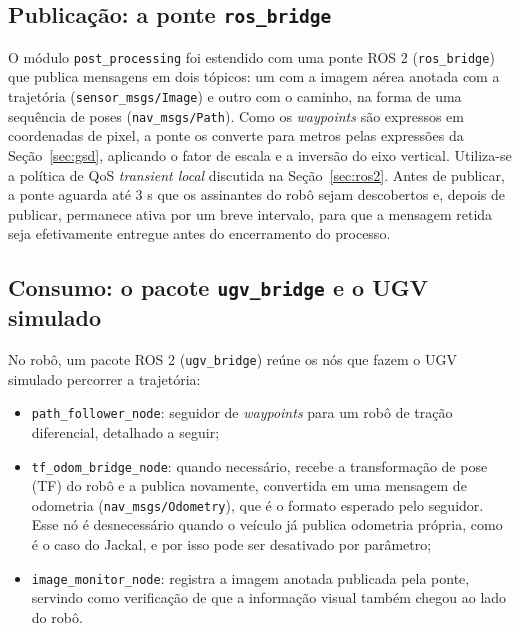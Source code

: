\documentclass[
    12pt,
    openright,
    oneside,
    a4paper,
    english,
    brazil
]{abntex2}
\begin{document}
\subsection{Publicação: a ponte \texttt{ros\_\allowbreak{}bridge}}

O módulo \texttt{post\_\allowbreak{}processing} foi estendido com uma ponte ROS 2 (\texttt{ros\_\allowbreak{}bridge}) que publica mensagens em dois tópicos: um com a imagem aérea anotada com a trajetória (\texttt{sensor\_\allowbreak{}msgs/\allowbreak{}Image}) e outro com o caminho, na forma de uma sequência de poses (\texttt{nav\_\allowbreak{}msgs/\allowbreak{}Path}). Como os \textit{waypoints} são expressos em coordenadas de pixel, a ponte os converte para metros pelas expressões da Seção~\ref{sec:gsd}, aplicando o fator de escala e a inversão do eixo vertical. Utiliza-se a política de QoS \textit{transient local} discutida na Seção~\ref{sec:ros2}. Antes de publicar, a ponte aguarda até 3 s que os assinantes do robô sejam descobertos e, depois de publicar, permanece ativa por um breve intervalo, para que a mensagem retida seja efetivamente entregue antes do encerramento do processo.

\subsection{Consumo: o pacote \texttt{ugv\_\allowbreak{}bridge} e o UGV simulado}

No robô, um pacote ROS 2 (\texttt{ugv\_\allowbreak{}bridge}) reúne os nós que fazem o UGV simulado percorrer a trajetória:

\begin{itemize}
    \item \texttt{path\_\allowbreak{}follower\_\allowbreak{}node}: seguidor de \textit{waypoints} para um robô de tração diferencial, detalhado a seguir;
    \item \texttt{tf\_\allowbreak{}odom\_\allowbreak{}bridge\_\allowbreak{}node}: quando necessário, recebe a transformação de pose (TF) do robô e a publica novamente, convertida em uma mensagem de odometria (\texttt{nav\_\allowbreak{}msgs/\allowbreak{}Odometry}), que é o formato esperado pelo seguidor. Esse nó é desnecessário quando o veículo já publica odometria própria, como é o caso do Jackal, e por isso pode ser desativado por parâmetro;
    \item \texttt{image\_\allowbreak{}monitor\_\allowbreak{}node}: registra a imagem anotada publicada pela ponte, servindo como verificação de que a informação visual também chegou ao lado do robô.
\end{itemize}
\end{document}
